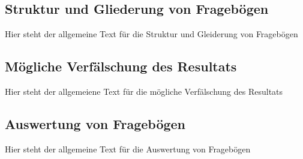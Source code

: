 \subsection{Struktur und Gliederung von Fragebögen}
Hier steht der allgemeine Text für die Struktur und Gleiderung von Fragebögen

\subsection{Mögliche Verfälschung des Resultats}
Hier steht der allgemeiene Text für die mögliche Verfälschung des
Resultats

\subsection{Auswertung von Fragebögen}
Hier steht der allgemeine Text für die Auswertung von Fragebögen
